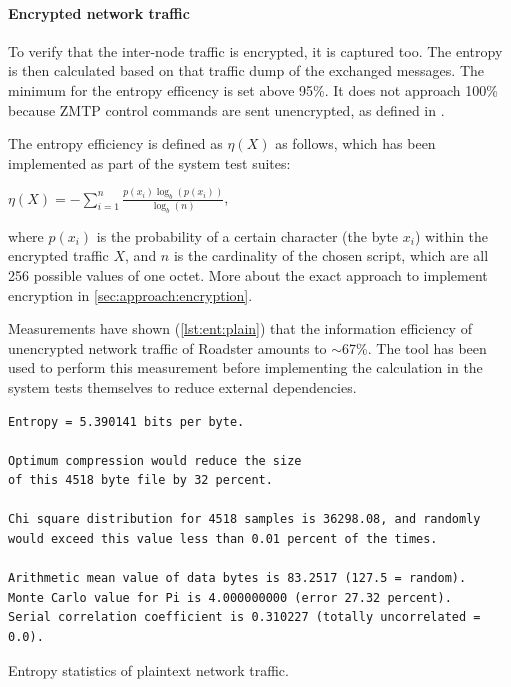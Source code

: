 \paragraph{Encrypted network traffic}
To verify that the inter-node traffic is encrypted, it is captured too. The entropy is then calculated
based on that traffic dump of the exchanged messages. The minimum for the entropy efficency is set
above 95\%. It does not approach 100\% because \gls{ZMTP} control
commands are sent unencrypted, as defined in \cite[High-level
Grammar]{zmq:curvezmq}.

The entropy efficiency is defined as $\eta(X)$ as follows, which has been
implemented as part of the system test suites:

\begin{center}
$\eta(X) = -\sum_{i=1}^n \frac{p(x_i) \log_b (p(x_i))}{\log_b (n)}$,
\end{center}

where $p(x_i)$ is the probability of a certain character (the byte $x_i$)
within the encrypted traffic $X$, and $n$ is the cardinality of the chosen
script, which are all 256 possible values of one octet. More about the exact
approach to implement encryption in \autoref{sec:approach:encryption}.

Measurements have shown (\autoref{lst:ent:plain}) that the information
efficiency of unencrypted network traffic of Roadster amounts to $\sim$67\%.
The  tool has been used to perform this measurement before implementing
the calculation in the system tests themselves to reduce external dependencies.

\begin{listing}
	\begin{verbatim}
Entropy = 5.390141 bits per byte.

Optimum compression would reduce the size
of this 4518 byte file by 32 percent.

Chi square distribution for 4518 samples is 36298.08, and randomly
would exceed this value less than 0.01 percent of the times.

Arithmetic mean value of data bytes is 83.2517 (127.5 = random).
Monte Carlo value for Pi is 4.000000000 (error 27.32 percent).
Serial correlation coefficient is 0.310227 (totally uncorrelated = 0.0).
	\end{verbatim}
	\caption{Entropy statistics of plaintext network traffic.}
	\label{lst:ent:plain}
\end{listing}



